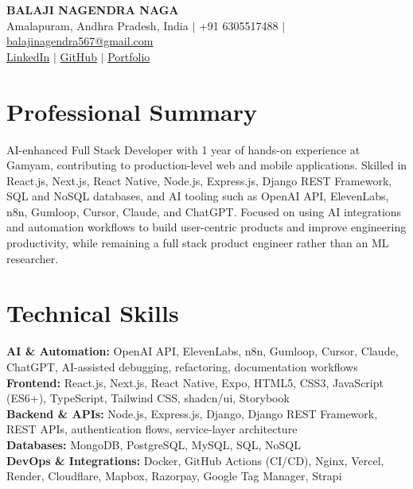 \documentclass[10pt,a4paper]{article}
\begin{document}
\begin{center}
{\Large \textbf{BALAJI NAGENDRA NAGA}}\\
Amalapuram, Andhra Pradesh, India $|$ +91 6305517488 $|$ \href{mailto:balajinagendra567@gmail.com}{balajinagendra567@gmail.com}\\
\href{https://www.linkedin.com/in/nagabalajinagendra/}{LinkedIn} $|$ \href{https://github.com/Naga-Balaji}{GitHub} $|$ \href{https://portfolio-balajinaga.vercel.app/}{Portfolio}
\end{center}

\section{Professional Summary}
AI-enhanced Full Stack Developer with 1 year of hands-on experience at Gamyam, contributing to production-level web and mobile applications. Skilled in React.js, Next.js, React Native, Node.js, Express.js, Django REST Framework, SQL and NoSQL databases, and AI tooling such as OpenAI API, ElevenLabs, n8n, Gumloop, Cursor, Claude, and ChatGPT. Focused on using AI integrations and automation workflows to build user-centric products and improve engineering productivity, while remaining a full stack product engineer rather than an ML researcher.

\section{Technical Skills}
\textbf{AI \& Automation:} OpenAI API, ElevenLabs, n8n, Gumloop, Cursor, Claude, ChatGPT, AI-assisted debugging, refactoring, documentation workflows\\
\textbf{Frontend:} React.js, Next.js, React Native, Expo, HTML5, CSS3, JavaScript (ES6+), TypeScript, Tailwind CSS, shadcn/ui, Storybook\\
\textbf{Backend \& APIs:} Node.js, Express.js, Django, Django REST Framework, REST APIs, authentication flows, service-layer architecture\\
\textbf{Databases:} MongoDB, PostgreSQL, MySQL, SQL, NoSQL\\
\textbf{DevOps \& Integrations:} Docker, GitHub Actions (CI/CD), Nginx, Vercel, Render, Cloudflare, Mapbox, Razorpay, Google Tag Manager, Strapi
\end{document}
